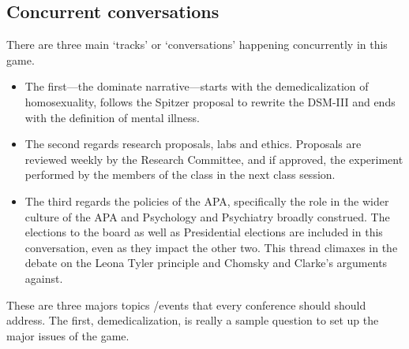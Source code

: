 \begin{refsection}
\subsection{Concurrent conversations}
\label{concurrentconversations}

There are three main ‘tracks’ or ‘conversations’ happening concurrently in this game. 

\begin{itemize}
\item The first---the dominate narrative---starts with the demedicalization of homosexuality, follows the Spitzer proposal to rewrite the DSM-III and ends with the definition of mental illness.

\item The second regards research proposals, labs and ethics. Proposals are reviewed weekly by the Research Committee, and if approved, the experiment performed by the members of the class in the next class session.

\item The third regards the policies of the APA, specifically the role in the wider culture of the APA and Psychology and Psychiatry broadly construed. The elections to the board as well as Presidential elections are included in this conversation, even as they impact the other two. This thread climaxes in the debate on the Leona Tyler principle and Chomsky and Clarke’s arguments against.

\end{itemize}

These are three majors topics \slash  events that every conference should should address. The first, demedicalization, is really a sample question to set up the major issues of the game.


\end{refsection}
